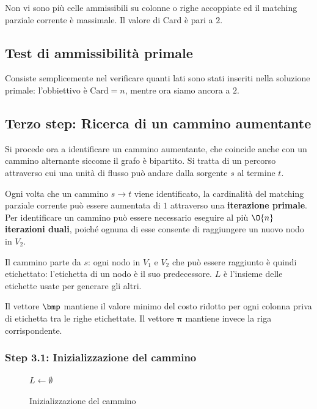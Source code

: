 \documentclass[\main/main.tex]{subfiles}
\begin{document}
Non vi sono più celle ammissibili su colonne o righe accoppiate ed il matching parziale corrente è massimale. Il valore di Card è pari a \(2\).

\subsection{Test di ammissibilità primale}
Consiste semplicemente nel verificare quanti lati sono stati inseriti nella soluzione primale: l'obbiettivo è \(\text{Card} = n\), mentre ora siamo ancora a \(2\).
\clearpage
\subsection{Terzo step: Ricerca di un cammino aumentante}
Si procede ora a identificare un cammino aumentante, che coincide anche con un cammino alternante siccome il grafo è bipartito. Si tratta di un percorso attraverso cui una unità di flusso può andare dalla sorgente \(s\) al termine \(t\).

Ogni volta che un cammino \(s\rightarrow t\) viene identificato, la cardinalità del matching parziale corrente può essere aumentata di \(1\) attraverso una \textbf{iterazione primale}. Per identificare un cammino può essere necessario eseguire al più \(\O{n}\) \textbf{iterazioni duali}, poiché ognuna di esse consente di raggiungere un nuovo nodo in \(V_2\).

Il cammino parte da \(s\): ogni nodo in \(V_1\) e \(V_2\) che può essere raggiunto è quindi etichettato: l'etichetta di un nodo è il suo predecessore. \(L\) è l'insieme delle etichette usate per generare gli altri.

Il vettore \(\bmp \) mantiene il valore minimo del costo ridotto per ogni colonna priva di etichetta tra le righe etichettate. Il vettore \(\bm{\pi} \) mantiene invece la riga corrispondente.

\subsubsection{Step 3.1: Inizializzazione del cammino}
\begin{figure}
	\begin{algorithm}[H]
		\SetAlgoLined
		\(L\leftarrow \emptyset\)\;
		\caption{Inizializzazione del cammino}
	\end{algorithm}
\end{figure}
\end{document}
